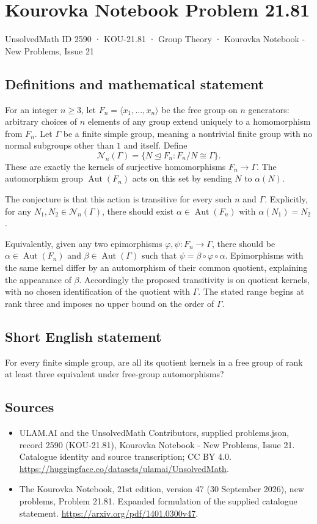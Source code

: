 \documentclass[11pt,a4paper]{article}
\begin{document}
\section*{Kourovka Notebook Problem 21.81}\label{2590}
{\small UnsolvedMath ID 2590 · KOU-21.81 · Group Theory · Kourovka Notebook - New Problems, Issue 21}
\subsection{Definitions and mathematical statement}
For an integer $n\ge3$, let $F_n=\langle x_1,\ldots,x_n\rangle$ be the free group on $n$ generators: arbitrary choices of $n$ elements of any group extend uniquely to a homomorphism from $F_n$. Let $\Gamma$ be a finite simple group, meaning a nontrivial finite group with no normal subgroups other than $1$ and itself. Define
\[
 \mathcal N_n(\Gamma)=\{N\trianglelefteq F_n:F_n/N\cong\Gamma\}.
\]
These are exactly the kernels of surjective homomorphisms $F_n\to\Gamma$. The automorphism group $\operatorname{Aut}(F_n)$ acts on this set by sending $N$ to $\alpha(N)$.

The conjecture is that this action is transitive for every such $n$ and $\Gamma$. Explicitly, for any $N_1,N_2\in\mathcal N_n(\Gamma)$, there should exist $\alpha\in\operatorname{Aut}(F_n)$ with $\alpha(N_1)=N_2$.

Equivalently, given any two epimorphisms $\varphi,\psi:F_n\to\Gamma$, there should be $\alpha\in\operatorname{Aut}(F_n)$ and $\beta\in\operatorname{Aut}(\Gamma)$ such that $\psi=\beta\circ\varphi\circ\alpha$. Epimorphisms with the same kernel differ by an automorphism of their common quotient, explaining the appearance of $\beta$. Accordingly the proposed transitivity is on quotient kernels, with no chosen identification of the quotient with $\Gamma$. The stated range begins at rank three and imposes no upper bound on the order of $\Gamma$.
\subsection{Short English statement}
For every finite simple group, are all its quotient kernels in a free group of rank at least three equivalent under free-group automorphisms?
\subsection{Sources}
\begin{itemize}
\item[S1] ULAM.AI and the UnsolvedMath Contributors, supplied problems.json, record 2590 (KOU-21.81), Kourovka Notebook - New Problems, Issue 21. Catalogue identity and source transcription; CC BY 4.0.
\url{https://huggingface.co/datasets/ulamai/UnsolvedMath}.
\item[S2] The Kourovka Notebook, 21st edition, version 47 (30 September 2026), new problems, Problem 21.81. Expanded formulation of the supplied catalogue statement.
\url{https://arxiv.org/pdf/1401.0300v47}.
\end{itemize}
\end{document}
